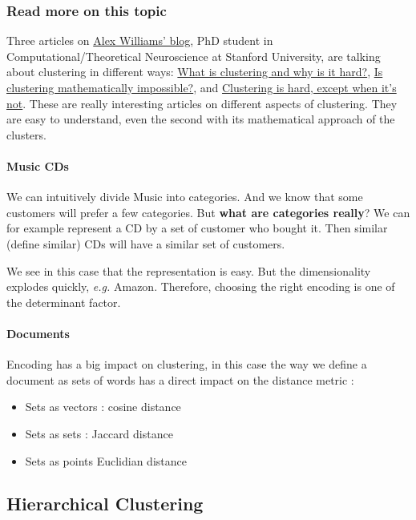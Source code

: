 \subsubsection{Read more on this topic}

Three articles on \href{http://alexhwilliams.info/itsneuronalblog/}{Alex Williams' blog}, PhD student in Computational/Theoretical Neuroscience at Stanford University, are talking about clustering in different ways: \href{http://alexhwilliams.info/itsneuronalblog/2015/09/11/clustering1/}{What is clustering and why is it hard?}, \href{http://alexhwilliams.info/itsneuronalblog/2015/10/01/clustering2/}{Is clustering mathematically impossible?}, and \href{http://alexhwilliams.info/itsneuronalblog/2015/11/18/clustering-is-easy/}{Clustering is hard, except when it's not}. These are really interesting articles on different aspects of clustering. They are easy to understand, even the second with its mathematical approach of the clusters.

\paragraph{Music CDs}

We can intuitively divide Music into categories. And we know that some customers will prefer a few categories. But {\bf what are categories really}? We can for example represent a CD by a set of customer who bought it. Then similar (define similar) CDs will have a similar set of customers.

We see in this case that the representation is easy. But the dimensionality explodes quickly, {\it e.g.} Amazon. Therefore, choosing the right encoding is one of the determinant factor.

\paragraph{Documents}

Encoding has a big impact on clustering, in this case the way we define a document as sets of words has a direct impact on the distance metric :
\begin{itemize}
	\item Sets as vectors : cosine distance
	\item Sets as sets : Jaccard distance
	\item Sets as points Euclidian distance
\end{itemize}

\subsection{Hierarchical Clustering}

